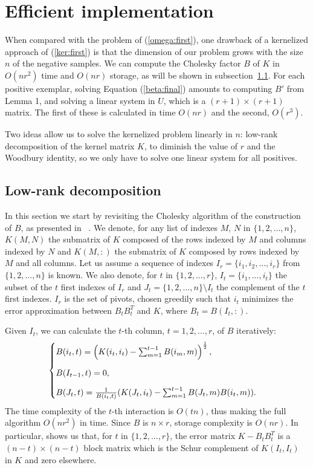 \section{Efficient implementation}\label{eff_imp}

When compared with the problem of (\ref{omega:first}), one drawback of a kernelized approach of (\ref{ker:first}) is that the dimension of our problem grows with the size $n$ of the negative samples.
We can compute the Cholesky factor $B$ of $K$ in $O(nr^2)$ time and $O(nr)$ storage, as will be shown in subsection~\ref{low-rank}. 
For each positive exemplar, solving Equation (\ref{beta:final}) amounts to computing $B'$ from Lemma 1, and solving a linear system in $U$, which is a $(r+1)\times (r+1)$ matrix. The first of these is calculated in time $O(nr)$ and the second, $O(r^3)$.

Two ideas allow us to solve the kernelized problem linearly in $n$: low-rank decomposition of the kernel matrix $K$, to diminish the value of $r$ and the Woodbury identity, so we only have to solve one linear system for all positives. 

\subsection{Low-rank decomposition} \label{low-rank}
In this section we start by revisiting the Cholesky algorithm of the construction of $B$, as presented in ~\cite{BaJo05,FiSc01}. 
We denote, for any list of indexes $M$, $N$ in $\{1,2,...,n\}$, $K(M,N)$ the submatrix of $K$ composed of the rows indexed by $M$ and columns indexed by $N$ and $K(M,:)$ the submatrix of $K$ composed by rows indexed by $M$ and all columns.
Let us assume a sequence of indexes $I_r=\{i_1,i_2,\dots ,i_r\}$ from $\{1,2,\dots, n\}$ is known. 
We also denote, for $t$ in $\{1,2,...,r\}$, $I_t=\{i_1,...,i_t\}$ the subset of the $t$ first indexes of $I_r$ and $J_t=\{1,2,...,n\} \setminus I_t$ the complement of the $t$ first indexes.
$I_r$ is the set of pivots, chosen greedily such that $i_t$ minimizes the error approximation between $B_tB_t^T$ and $K$, where $B_t=B(I_t,:)$. 

Given $I_t$, we can calculate the $t$-th column, $t=1,2,...,r$, of $B$ iteratively:
\begin{align}
\begin{cases}
\vspace{3 mm}
B(i_t, t) = \left(K(i_t,i_t)-\sum_{m=1}^{t-1} B(i_{m},m)  \right)^{\frac{1}{2}},\\
\vspace{3 mm}
B(I_{t-1},t) = 0,\\
B(J_t, t) = \frac{1}{B(i_t,t)}(K(J_t,i_t)  -\sum_{m=1}^{t-1}B(J_t,m)B(i_t,m)
).\end{cases}\label{icd:algo}
\end{align}
The time complexity of the $t$-th interaction is $O(tn)$, thus making the full algorithm $O(nr^2)$ in time. Since $B$ is $n\times r$, storage complexity is $O(nr)$. In particular, \cite{BaJo05} shows us that, for $t$ in $\{1,2,...,r\}$, the error matrix $K-B_tB_t^T$ is a $(n-t)\times (n-t)$ block matrix which is the Schur complement of $K(I_t,I_t)$ in $K$ and zero elsewhere.

